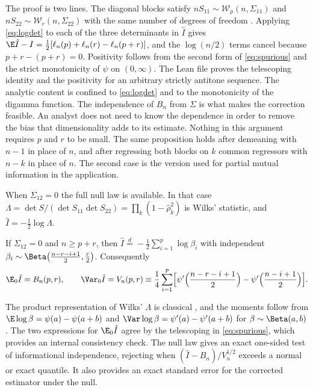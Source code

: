The proof is two lines. The diagonal blocks satisfy $nS_{11}\sim\mathcal W_p(n,\Sigma_{11})$ and $nS_{22}\sim\mathcal W_r(n,\Sigma_{22})$ with the same number of degrees of freedom \citep[Ch.~3]{muirhead1982aspects}. Applying \eqref{eq:logdet} to each of the three determinants in $\hat I$ gives $\E\hat I-I=\tfrac12[\ell_n(p)+\ell_n(r)-\ell_n(p+r)]$, and the $\log(n/2)$ terms cancel because $p+r-(p+r)=0$. Positivity follows from the second form of \eqref{eq:spurious} and the strict monotonicity of $\psi$ on $(0,\infty)$. The Lean file proves the telescoping identity and the positivity for an arbitrary strictly antitone sequence. The analytic content is confined to \eqref{eq:logdet} and to the monotonicity of the digamma function. The independence of $B_n$ from $\Sigma$ is what makes the correction feasible. An analyst does not need to know the dependence in order to remove the bias that dimensionality adds to its estimate. Nothing in this argument requires $p$ and $r$ to be small. The same proposition holds after demeaning with $n-1$ in place of $n$, and after regressing both blocks on $k$ common regressors with $n-k$ in place of $n$. The second case is the version used for partial mutual information in the application.

When $\Sigma_{12}=0$ the full null law is available. In that case $\Lambda=\det S/(\det S_{11}\det S_{22})=\prod_k(1-\hat\rho_k^2)$ is Wilks' statistic, and $\hat I=-\tfrac12\log\Lambda$.

\begin{proposition*}
If $\Sigma_{12}=0$ and $n\geq p+r$, then $\hat I\stackrel{d}{=}-\tfrac12\sum_{i=1}^p\log\beta_i$ with independent $\beta_i\sim\Beta\bigl(\tfrac{n-r-i+1}2,\tfrac r2\bigr)$. Consequently
\[
 \E_0\hat I=B_n(p,r),\qquad
 \Var_0\hat I=V_n(p,r)\equiv\frac14\sum_{i=1}^p\Bigl[\psi'\Bigl(\frac{n-r-i+1}2\Bigr)-\psi'\Bigl(\frac{n-i+1}2\Bigr)\Bigr].
\]
\end{proposition*}

The product representation of Wilks' $\Lambda$ is classical \citep[Ch.~8]{anderson2003introduction}, and the moments follow from $\E\log\beta=\psi(a)-\psi(a+b)$ and $\Var\log\beta=\psi'(a)-\psi'(a+b)$ for $\beta\sim\Beta(a,b)$. The two expressions for $\E_0\hat I$ agree by the telescoping in \eqref{eq:spurious}, which provides an internal consistency check. The null law gives an exact one-sided test of informational independence, rejecting when $(\hat I-B_n)/V_n^{1/2}$ exceeds a normal or exact quantile. It also provides an exact standard error for the corrected estimator under the null.

